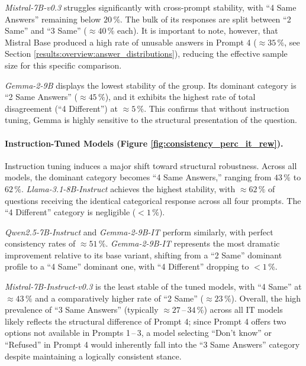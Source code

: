 \textit{Mistral-7B-v0.3} struggles significantly with cross-prompt stability, with ``4 Same Answers'' remaining below $20\,\%$. The bulk of its responses are split between ``2 Same'' and ``3 Same'' ($\approx 40\,\%$ each). It is important to note, however, that Mistral Base produced a high rate of unusable answers in Prompt 4 ($\approx 35\,\%$, see Section \ref{results:overview:answer_distributions}), reducing the effective sample size for this specific comparison.

\textit{Gemma-2-9B} displays the lowest stability of the group. Its dominant category is ``2 Same Answers'' ($\approx 45\,\%$), and it exhibits the highest rate of total disagreement (``4 Different'') at $\approx 5\,\%$. This confirms that without instruction tuning, Gemma is highly sensitive to the structural presentation of the question.

\vspace{-0.4cm}
\paragraph{Instruction-Tuned Models (Figure \ref{fig:consistency_perc_it_rew}).}
Instruction tuning induces a major shift toward structural robustness. Across all models, the dominant category becomes ``4 Same Answers,'' ranging from $43\,\%$ to $62\,\%$.
\textit{Llama-3.1-8B-Instruct} achieves the highest stability, with $\approx 62\,\%$ of questions receiving the identical categorical response across all four prompts. The ``4 Different'' category is negligible ($< 1\,\%$).

\textit{Qwen2.5-7B-Instruct} and \textit{Gemma-2-9B-IT} perform similarly, with perfect consistency rates of $\approx 51\,\%$. \textit{Gemma-2-9B-IT} represents the most dramatic improvement relative to its base variant, shifting from a ``2 Same'' dominant profile to a ``4 Same'' dominant one, with ``4 Different'' dropping to $<1\,\%$.

\textit{Mistral-7B-Instruct-v0.3} is the least stable of the tuned models, with ``4 Same'' at $\approx 43\,\%$ and a comparatively higher rate of ``2 Same'' ($\approx 23\,\%$).
Overall, the high prevalence of ``3 Same Answers'' (typically $\approx 27$\,--\,$34\,\%$) across all IT models likely reflects the structural difference of Prompt 4; since Prompt 4 offers two options not available in Prompts 1\,--\,3, a model selecting ``Don't know'' or ``Refused'' in Prompt 4 would inherently fall into the ``3 Same Answers'' category despite maintaining a logically consistent stance.


